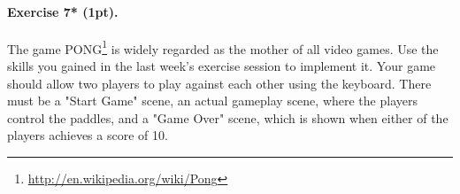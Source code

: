 \documentclass{article}
\newenvironment{exercise}[2]{\paragraph{Exercise #1 (#2pt).} }{\medskip}
\begin{document}
\begin{exercise}{7*}{1}
The game PONG\footnote{\url{http://en.wikipedia.org/wiki/Pong}} is widely regarded as the mother of all video games. Use the skills you gained in the last week's exercise session to implement it. Your game should allow two players to play against each other using the keyboard. There must be a "Start Game" scene, an actual gameplay scene, where the players control the paddles, and a "Game Over" scene, which is shown when either of the players achieves a score of 10.
\end{exercise}
\end{document}
